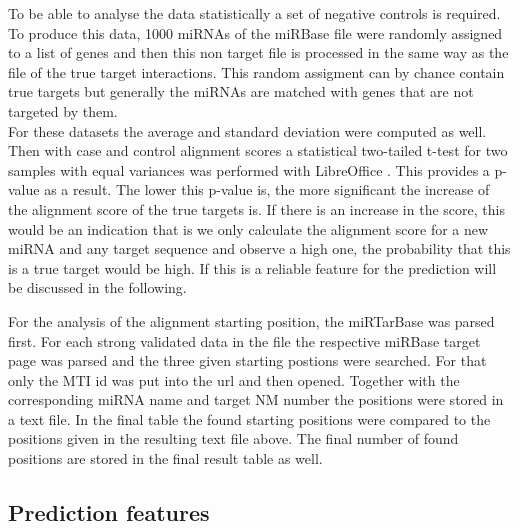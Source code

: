 \documentclass[12pt]{article}
\begin{document}
To be able to analyse the data statistically a set of negative controls is required. To produce this data, 1000 miRNAs of the miRBase file were randomly assigned to a list of genes and then this non target file is processed in the same way as the file of the true target interactions. This random assigment can by chance contain true targets but generally the miRNAs are matched with genes that are not targeted by them. \\

For these datasets the average and standard deviation were computed as well. Then with case and control alignment scores a statistical two-tailed t-test for two samples with equal variances was performed with LibreOffice \cite{ttest}. This provides a p-value as a result. The lower this p-value is, the more significant the increase of the alignment score of the true targets is. If there is an increase in the score, this would be an indication that is we only calculate the alignment score for a new miRNA and any target sequence and observe a high one, the probability that this is a true target would be high. If this is a reliable feature for the prediction will be discussed in the following.

For the analysis of the alignment starting position, the miRTarBase was parsed first. For each strong validated data in the file the respective miRBase target page was parsed and the three given starting postions were searched. For that only the MTI id was put into the url and then opened. Together with the corresponding miRNA name and target NM number the positions were stored in a text file. In the final table the found starting positions were compared to the positions given in the resulting text file above. The final number of found positions are stored in the final result table as well. 



\vspace{1cm}


\subsection{Prediction features}
\end{document}
